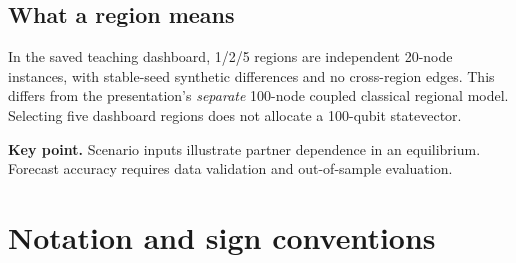 \documentclass[11pt,letterpaper]{article}
\newcommand{\takeaway}[1]{\par\smallskip\textbf{Key point.} #1\par}
\begin{document}
\subsection{What a region means}
In the saved teaching dashboard, 1/2/5 regions are independent 20-node instances, with stable-seed synthetic differences and no cross-region edges. This differs from the presentation's \emph{separate} 100-node coupled classical regional model. Selecting five dashboard regions does not allocate a 100-qubit statevector.
\takeaway{Scenario inputs illustrate partner dependence in an equilibrium. Forecast accuracy requires data validation and out-of-sample evaluation.}
\section{Notation and sign conventions}\label{sec:notation}
\end{document}
